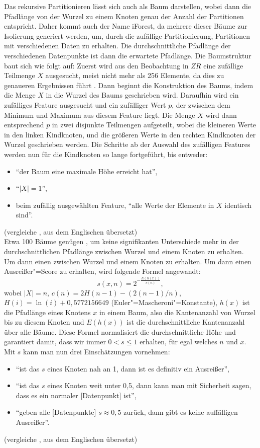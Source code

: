Das rekursive Partitionieren lässt sich auch als Baum darstellen, wobei dann die Pfadlänge von der Wurzel zu einem Knoten genau der Anzahl der Partitionen entspricht. Daher kommt auch der Name iForest, da mehrere dieser Bäume zur Isolierung generiert werden, um, durch die zufällige Partitionierung, Partitionen mit verschiedenen Daten zu erhalten. Die durchschnittliche Pfadlänge der verschiedenen Datenpunkte ist dann die erwartete Pfadlänge. Die Baumstruktur baut sich wie folgt auf: Zuerst wird aus den Beobachtung in $ZR$ eine zufällige Teilmenge $X$ ausgesucht, meist nicht mehr als 256 Elemente, da dies zu genaueren Ergebnissen führt \cite[Ch. 4.1]{iForest}. Dann beginnt die Konstruktion des Baums, indem die Menge $X$ in die Wurzel des Baums geschrieben wird. Daraufhin wird ein zufälliges Feature ausgesucht und ein zufälliger Wert $p$, der zwischen dem Minimum und Maximum aus diesem Feature liegt. Die Menge $X$ wird dann entsprechend $p$ in zwei disjunkte Teilmengen aufgeteilt, wobei die kleineren Werte in den linken Kindknoten, und die größeren Werte in den rechten Kindknoten der Wurzel geschrieben werden. Die Schritte ab der Auswahl des zufälligen Features werden nun für die Kindknoten so lange fortgeführt, bis entweder:
\begin{itemize}
    \item "`der Baum eine maximale Höhe erreicht hat"',
    \item "`$|X|=1$"',
    \item beim zufällig ausgewählten Feature, "`alle Werte der Elemente in $X$  identisch sind"'.
\end{itemize}
(vergleiche \cite[Ch. 2]{iForest}, aus dem Englischen übersetzt) \\
Etwa 100 Bäume genügen \cite[Ch. 4.1]{iForest}, um keine signifikanten Unterschiede mehr in der durchschnittlichen Pfadlänge zwischen Wurzel und einem Knoten zu erhalten. Um dann einen zwischen Wurzel und einem Knoten zu erhalten. Um dann einen Ausreißer"=Score zu erhalten, wird folgende Formel angewandt:
\[ s(x,n)=2^{-\frac{E(h(x))}{c(n)}}, \]
wobei $|X|=n$, $c(n)=2H(n-1)-(2(n-1)/n)$, $H(i)=\ln(i) + 0,5772156649$ (Euler"=Mascheroni"=Konstante), $h(x)$ ist die Pfadlänge eines Knotens $x$ in einem Baum, also die Kantenanzahl von Wurzel bis zu diesem Knoten und $E(h(x))$ ist die durchschnittliche Kantenanzahl über alle Bäume. Diese Formel normalisiert die durchschnittliche Höhe und garantiert damit, dass wir immer $0 < s \le 1$ erhalten, für egal welches $n$ und $x$. Mit $s$ kann man nun drei Einschätzungen vornehmen:
\begin{itemize}
    \item "`ist das $s$ eines Knoten nah an 1, dann ist es definitiv ein Ausreißer"',
    \item "`ist das $s$ eines Knoten weit unter 0,5, dann kann man mit Sicherheit sagen, dass es ein normaler [Datenpunkt] ist"',
    \item "`geben alle [Datenpunkte] $s \approx 0,5$ zurück, dann gibt es keine auffälligen Ausreißer"'.
\end{itemize}
(vergleiche \cite[Ch. 2]{iForest}, aus dem Englischen übersetzt) \\